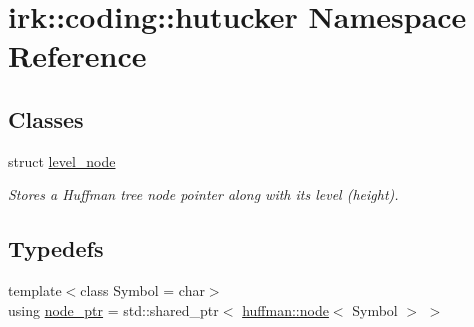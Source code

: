 \hypertarget{namespaceirk_1_1coding_1_1hutucker}{}\section{irk\+:\+:coding\+:\+:hutucker Namespace Reference}
\label{namespaceirk_1_1coding_1_1hutucker}
\subsection*{Classes}
\begin{DoxyCompactItemize}
\item 
struct \mbox{\hyperlink{structirk_1_1coding_1_1hutucker_1_1level__node}{level\+\_\+node}}
\begin{DoxyCompactList}\small\item\em Stores a Huffman tree node pointer along with its level (height). \end{DoxyCompactList}\end{DoxyCompactItemize}
\subsection*{Typedefs}
\begin{DoxyCompactItemize}
\item 
{\footnotesize template$<$class Symbol  = char$>$ }\\using \mbox{\hyperlink{namespaceirk_1_1coding_1_1hutucker_aa5d22cfdf05ffec38f2531e0307248fe}{node\+\_\+ptr}} = std\+::shared\+\_\+ptr$<$ \mbox{\hyperlink{structirk_1_1coding_1_1huffman_1_1node}{huffman\+::node}}$<$ Symbol $>$ $>$
\end{DoxyCompactItemize}
